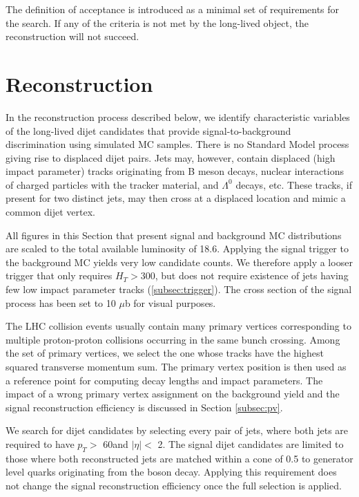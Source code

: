 The definition of acceptance is introduced as a minimal set of requirements for the search.
If any of the criteria is not met by the long-lived object, the reconstruction will not succeed.

\section{Reconstruction}

In the reconstruction process described below, we identify characteristic variables
of the long-lived dijet candidates that provide
signal-to-background discrimination using simulated MC samples.    
There is no Standard Model process giving rise to displaced dijet pairs. Jets may,
however, contain displaced (high impact parameter) tracks originating from B meson decays, nuclear
interactions of charged particles with the tracker material, \Kshort and $\Lambda^0$ decays, etc. These tracks, if 
present for two distinct jets,
may then cross at a displaced location and mimic a common dijet vertex. 

All figures in this Section that present signal and background MC distributions 
are scaled to the total available luminosity
of 18.6\fbinv. Applying the signal trigger to the background MC yields very low candidate
counts. We therefore apply a looser trigger that only requires $H_T>$300\GeV, 
but does not require existence of jets
having few low impact parameter tracks (\ref{subsec:trigger}).  
 The cross section of the signal process has been set to 10 $\mu$b for visual purposes.   

The LHC collision events usually contain many primary vertices corresponding to multiple proton-proton collisions occurring 
in the same bunch crossing.
Among the set of primary vertices, we select the one whose tracks have the highest squared transverse momentum sum.
 The primary vertex position is
then used as a reference point for computing decay lengths and impact parameters. The impact of a wrong
primary vertex assignment on the background yield and the signal reconstruction efficiency is discussed
in Section \ref{subsec:pv}. 


We search for dijet candidates by selecting every pair of jets, where both jets are required
to have $p_T>$ 60\GeV and $|\eta|<$ 2. 
The signal dijet candidates are limited
to those where both reconstructed jets are matched within a cone of 0.5 to generator level quarks originating
 from the \X boson decay. Applying this requirement does not change the signal reconstruction efficiency
once the full selection is applied. 

